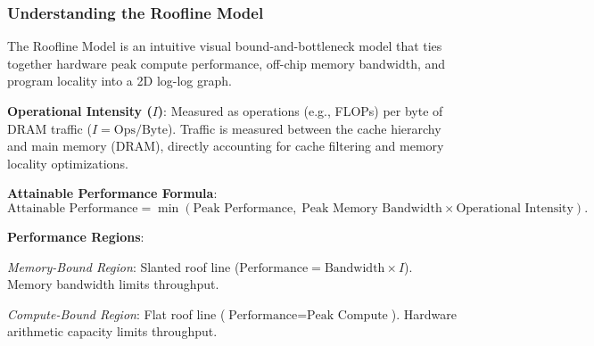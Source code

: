 \subsubsection{Understanding the Roofline Model}
The Roofline Model is an intuitive visual bound-and-bottleneck model that ties together hardware peak compute performance, off-chip memory bandwidth, and program locality into a 2D log-log graph.

\begin{dashlist}
    \item \textbf{Operational Intensity ($I$)}: Measured as operations (e.g., FLOPs) per byte of DRAM traffic ($I = \text{Ops} / \text{Byte}$). Traffic is measured between the cache hierarchy and main memory (DRAM), directly accounting for cache filtering and memory locality optimizations.
    \item \textbf{Attainable Performance Formula}:
    \[
    \text{Attainable Performance} = \min\left(\text{Peak Performance}, \; \text{Peak Memory Bandwidth} \times \text{Operational Intensity}\right) .
    \]
    \item \textbf{Performance Regions}:
    \begin{dashlist}
        \item \textit{Memory-Bound Region}: Slanted roof line ($\text{Performance} = \text{Bandwidth} \times I$). Memory bandwidth limits throughput.
        \item \textit{Compute-Bound Region}: Flat roof line ($\text{Performance} = \text{Peak Compute}$). Hardware arithmetic capacity limits throughput.
    \end{dashlist}
\end{dashlist}

